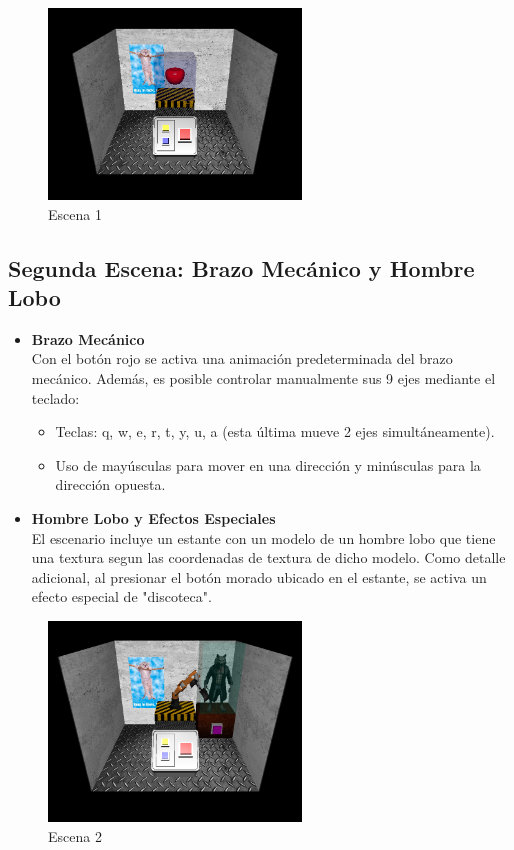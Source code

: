 \documentclass{article}
\begin{document}
\begin{figure}[h]
\centering
\includegraphics[width=0.6\textwidth]{./images/Escena1.png}
\caption{Escena 1}
\end{figure}	


\pagebreak
\subsection*{Segunda Escena: Brazo Mecánico y Hombre Lobo}

\begin{itemize}
    \item \textbf{Brazo Mecánico} \\
    Con el botón rojo se activa una animación predeterminada del brazo mecánico. Además, es posible controlar manualmente sus 9 ejes mediante el teclado:
    \begin{itemize}
        \item Teclas: q, w, e, r, t, y, u, a (esta última mueve 2 ejes simultáneamente).
        \item Uso de mayúsculas para mover en una dirección y minúsculas para la dirección opuesta.
    \end{itemize}

    \item \textbf{Hombre Lobo y Efectos Especiales} \\
    El escenario incluye un estante con un modelo de un hombre lobo que tiene una textura segun las coordenadas de textura de dicho modelo. Como detalle adicional, al presionar el botón morado ubicado en el estante, se activa un efecto especial de "discoteca".
\end{itemize}

\begin{figure}[h]
	\centering
	\includegraphics[width=0.6\textwidth]{./images/Escena2.png}
	\caption{Escena 2}
	\end{figure}	
\end{document}
